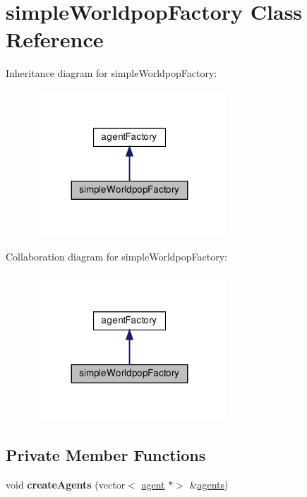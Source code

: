 \hypertarget{classsimpleWorldpopFactory}{}\section{simple\+Worldpop\+Factory Class Reference}
\label{classsimpleWorldpopFactory}


Inheritance diagram for simple\+Worldpop\+Factory\+:\nopagebreak
\begin{figure}[H]
\begin{center}
\leavevmode
\includegraphics[width=203pt]{classsimpleWorldpopFactory__inherit__graph}
\end{center}
\end{figure}


Collaboration diagram for simple\+Worldpop\+Factory\+:\nopagebreak
\begin{figure}[H]
\begin{center}
\leavevmode
\includegraphics[width=203pt]{classsimpleWorldpopFactory__coll__graph}
\end{center}
\end{figure}
\subsection*{Private Member Functions}
\begin{DoxyCompactItemize}
\item 
\mbox{\label{classsimpleWorldpopFactory_a5093cf767e45d5456f8cac1aba3a4649}} 
void {\bfseries create\+Agents} (vector$<$ \mbox{\hyperlink{classagent}{agent}} $\ast$$>$ \&\mbox{\hyperlink{classagents}{agents}})
\end{DoxyCompactItemize}
